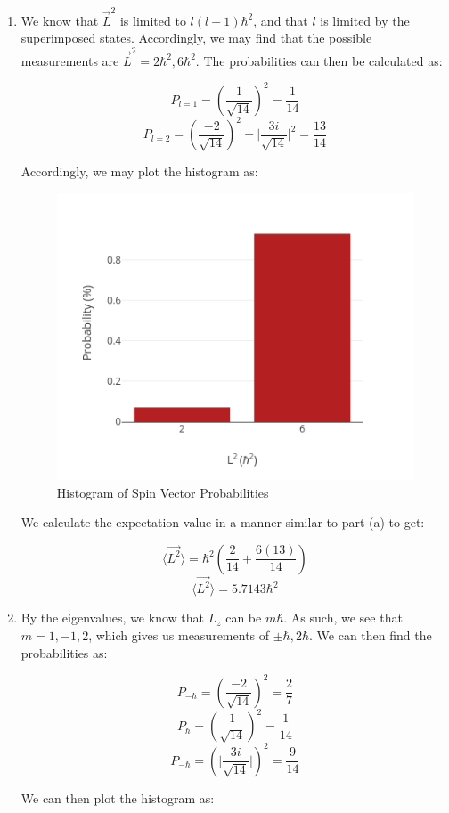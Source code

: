 \begin{enumerate}
\begin{enumerate}
      \item We know that $\vec{L}^2$ is limited to $l(l+1)\hbar^2$, and that $l$ is limited by the superimposed states. Accordingly, we may find that the possible measurements are $\boxed{\vec{L}^2=2\hbar^2,6\hbar^2}$. The probabilities can then be calculated as:

        $$\boxed{P_{l=1}=\left( \frac{1}{\sqrt{14}} \right)^2=\frac{1}{14}}$$
        $$\boxed{P_{l=2}=\left( \frac{-2}{\sqrt{14}} \right)^2+\Big|\frac{3i}{\sqrt{14}}\Big|^2=\frac{13}{14}}$$

        Accordingly, we may plot the histogram as:

        \begin{figure}[H]
          \centering
          \includegraphics[width=.5\textwidth]{Figures/HW8-2b}
          \caption{Histogram of Spin Vector Probabilities}
          \label{fig:2}
        \end{figure}

        We calculate the expectation value in a manner similar to part (a) to get:

        $$\langle \vec{L^2}\rangle=\hbar^2\left( \frac{2}{14}+\frac{6(13)}{14} \right)$$
        $$\boxed{\langle \vec{L^2}\rangle=5.7143\hbar^2}$$

      \item By the eigenvalues, we know that $L_z$ can be $m\hbar$. As such, we see that $m=1,-1,2$, which gives us measurements of $\pm\hbar,2\hbar$. We can then find the probabilities as:

        $$\boxed{P_{-\hbar}=\left( \frac{-2}{\sqrt{14}} \right)^2=\frac{2}{7}}$$
        $$\boxed{P_{\hbar}=\left( \frac{1}{\sqrt{14}} \right)^2=\frac{1}{14}}$$
        $$\boxed{P_{-\hbar}=\left( \Big|\frac{3i}{\sqrt{14}} \Big|\right)^2=\frac{9}{14}}$$

        We can then plot the histogram as:


\end{enumerate}
\end{enumerate}
